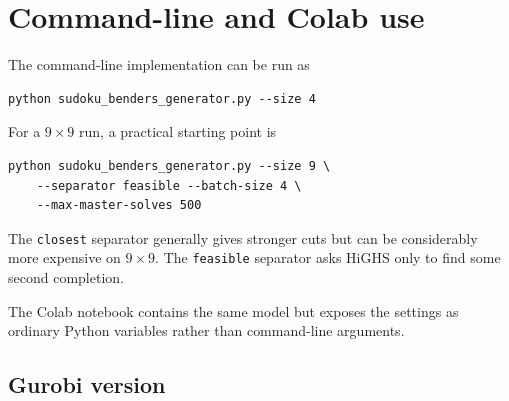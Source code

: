\documentclass[11pt]{article}
\begin{document}
\section{Command-line and Colab use}

The command-line implementation can be run as
\begin{verbatim}
python sudoku_benders_generator.py --size 4
\end{verbatim}
For a $9\times9$ run, a practical starting point is
\begin{verbatim}
python sudoku_benders_generator.py --size 9 \
    --separator feasible --batch-size 4 \
    --max-master-solves 500
\end{verbatim}
The \texttt{closest} separator generally gives stronger cuts but can be considerably more expensive on $9\times9$. The \texttt{feasible} separator asks HiGHS only to find some second completion.

The Colab notebook contains the same model but exposes the settings as ordinary Python variables rather than command-line arguments.

\subsection*{Gurobi version}
\end{document}
